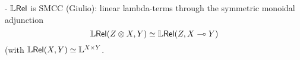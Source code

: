
- $\mathbb{L}\mathsf{Rel}$ is SMCC (Giulio): linear lambda-terms through the symmetric monoidal adjunction 
$$
\mathbb{L}\mathsf{Rel}(Z\otimes X, Y) \simeq \mathbb{L}\mathsf{Rel} (Z, X\multimap Y)
$$
(with $\mathbb{L}\mathsf{Rel}(X,Y)\simeq \mathbb{L}^{X\times Y}$.




